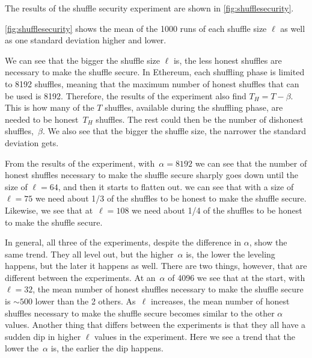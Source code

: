 The results of the shuffle security experiment are shown in \autoref{fig:shufflesecurity}.

\autoref{fig:shufflesecurity} shows the mean of the 1000 runs of each shuffle size $\ell$ as well as one standard deviation higher and lower.

We can see that the bigger the shuffle size $\ell$ is, the less honest shuffles are necessary to make the shuffle secure.
In Ethereum, each shuffling phase is limited to 8192 shuffles, meaning that the maximum number of honest shuffles that can be used is 8192.
Therefore, the results of the experiment also find $T_H=T-\beta$.
This is how many of the $T$ shuffles, available during the shuffling phase, are needed to be honest~$T_H$ shuffles.
The rest could then be the number of dishonest shuffles,~$\beta$.
We also see that the bigger the shuffle size, the narrower the standard deviation gets.

From the results of the experiment, with~$\alpha=8192$ we can see that the number of honest shuffles necessary to make the shuffle secure sharply goes down until the size of $\ell=64$, and then it starts to flatten out.
we can see that with a size of $\ell=75$ we need about 1/3 of the shuffles to be honest to make the shuffle secure.
Likewise, we see that at~$\ell=108$ we need about 1/4 of the shuffles to be honest to make the shuffle secure.

In general, all three of the experiments, despite the difference in $\alpha$, show the same trend.
They all level out, but the higher~$\alpha$ is, the lower the leveling happens, but the later it happens as well.
There are two things, however, that are different between the experiments.
At an~$\alpha$ of 4096 we see that at the start, with $\ell=32$, the mean number of honest shuffles necessary to make the shuffle secure is $\sim 500$ lower than the 2 others.
As~$\ell$ increases, the mean number of honest shuffles necessary to make the shuffle secure becomes similar to the other $\alpha$ values.
Another thing that differs between the experiments is that they all have a sudden dip in higher $\ell$ values in the experiment.
Here we see a trend that the lower the~$\alpha$ is, the earlier the dip happens.

